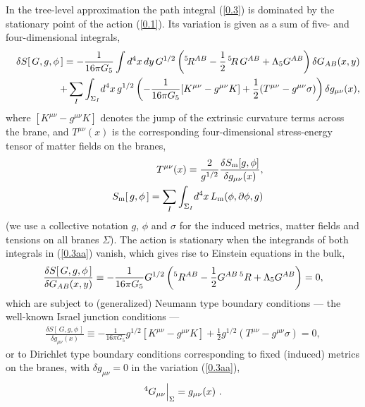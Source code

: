 \documentclass[a4paper,preprint,nofootinbib,
                 showpacs,preprintnumbers,amsmath,amssymb]{revtex4}
\begin{document}
In the tree-level approximation the path integral (\ref{0.3}) is 
dominated by the stationary point of the action (\ref{0.1}). Its 
variation is given as a sum of five- and four-dimensional 
integrals, 
    \begin{eqnarray} 
    &&\delta S[\,G,g,\phi\,]=-\frac1{16\pi G_5}\int d^4x\,dy\, 
    G^{1/2}\left(\vphantom{I}^5\!R^{AB} 
     -\frac12\,\vphantom{I}^5\!R\, 
     G^{AB}+\Lambda_5 G^{AB}\right)\delta G_{AB}(x,y)  \nonumber\\ 
     &&\qquad\quad 
     +\sum\limits_{I}\int_{\Sigma_I}\! 
     d^4x\, 
     g^{1/2}\left(-\frac1{16\pi G_5}[K^{\mu\nu} 
     -g^{\mu\nu}K] 
     +\frac12(T^{\mu\nu} 
     -g^{\mu\nu}\sigma)\right)\delta g_{\mu\nu}(x), \label{0.3aa} 
    \end{eqnarray} 
where $\left[K^{\mu\nu}-g^{\mu\nu}K\right]$ denotes the jump of 
the extrinsic curvature terms across the brane, and 
$T^{\mu\nu}(x)$ is the corresponding four-dimensional stress-energy 
tensor of matter fields on the branes, 
    \begin{eqnarray} 
    &&T^{\mu\nu}(x)=\frac2{g^{1/2}} 
    \frac{\delta S_{\rm m}[g,\phi]} 
    {\delta g_{\mu\nu}(x)},         \label{0.4aa}\\ 
    &&S_{\rm m}[\,g,\phi\,]= 
    \sum\limits_{I}\int_{\Sigma_I}\! 
     d^4x\, L_{\rm m}(\phi,\partial\phi,g)        \label{0.4a} 
     \end{eqnarray} 
(we use a collective notation $g$, $\phi$ and $\sigma$ for the induced 
metrics, matter fields and tensions on all branes $\Sigma$). The 
action is stationary when the integrands of both integrals in 
(\ref{0.3aa}) vanish, which gives rise to Einstein equations in 
the bulk, 
    \begin{eqnarray} 
     \frac{\delta S[\,G,g,\phi\,]} 
     {\delta G_{AB}(x,y)}\equiv 
     -\frac1{16\pi G_5} G^{1/2} 
     \left(\vphantom{I}^5R^{AB} 
     -\frac12G^{AB}\,\vphantom{I}^5R 
     +\Lambda_5 G^{AB}\right)=0,   \label{0.6a} 
     \end{eqnarray} 
which are subject to (generalized) Neumann type boundary conditions --- the 
well-known Israel junction conditions --- 
     \begin{eqnarray} 
     \frac{\delta S[\,G,g,\phi\,]} 
     {\delta g_{\mu\nu}(x)} 
     \equiv 
     -\frac1{16\pi G_5}g^{1/2}\left[K^{\mu\nu} 
     -g^{\mu\nu}K\right] 
     +\frac12g^{1/2}(T^{\mu\nu} 
     -g^{\mu\nu}\sigma)=0,              \label{0.7a} 
     \end{eqnarray} 
or to Dirichlet type boundary conditions corresponding to fixed 
(induced) metrics on the branes, with $\delta g_{\mu\nu}=0$ in the 
variation (\ref{0.3aa}), 
     \begin{eqnarray} 
     \vphantom{I}^4G_{\mu\nu}\Big|_\Sigma 
     =g_{\mu\nu}(x)\ .                           \label{0.7} 
     \end{eqnarray} 
 
\end{document}
